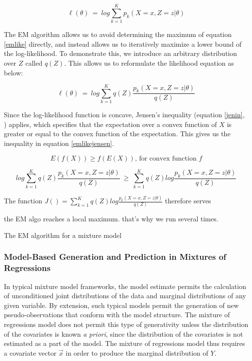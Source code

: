 \documentclass[10pt]{olplainarticle}\usepackage[]{graphicx}\usepackage[]{color}
\begin{document}
\begin{equation} \label{emlike}
   \ell(\theta) \ =\ log \sum_{k=1}^{K} p_k(X=x, Z=z | \theta)
\end{equation}

The EM algorithm allows us to avoid determining the maximum of equation \ref{emlike} directly, and instead allows us to iteratively maximize a lower bound of the log-likelihood. To demonstrate this, we introduce an arbitrary distribution over $Z$ called $q(Z)$. This allows us to reformulate the likelihood equation as below:

\begin{equation} \label{emlikeqz}
   \ell(\theta) \ =\ log \sum_{k=1}^{K}q(Z) \frac{p_k(X=x, Z=z | \theta)}{q(Z)}
\end{equation}

Since the log-likelihood function is concave, Jensen's inequality (equation \ref{jenin}, \cite{jensen}) applies, which specifies that the expectation over a convex function of $X$ is greater or equal to the convex function of the expectation. This gives us the inequality in equation \ref{emlikejensen}.

\begin{equation} \label{jenin}
   E(f(X)) \geq f(E(X)) \text{, for convex function $f$}
\end{equation}

\begin{equation} \label{emlikejensen}
   log \sum_{k=1}^{K}q(Z) \frac{p_k(X=x, Z=z | \theta)}{q(Z)} \ \geq\ \sum_{k=1}^{K}q(Z) log \frac{p_k(X=x, Z=z | \theta)}{q(Z)}
\end{equation}

The function $J() = \sum_{k=1}^{K}q(Z) log \frac{p_k(X=x, Z=z | \theta)}{q(Z)}$ therefore serves 

the EM algo reaches a local maximum. that's why we run several times.

The EM algorithm for a mixture model


\subsubsection{Model-Based Generation and Prediction in Mixtures of Regressions} \label{prediction}

In typical mixture model frameworks, the model estimate permits the calculation of unconditioned joint distributions of the data and marginal distributions of any given variable. By extension, such typical models permit the generation of new pseudo-observations that conform with the model structure. The mixture of regressions model does not permit this type of generativity unless the distribution of the covariates is known \emph{a priori}, since the distribution of the covariates is not estimated as a part of the model. The mixture of regressions model thus requires a covariate vector $\vec{x}$ in order to produce the marginal distribution of $Y$.
\end{document}
